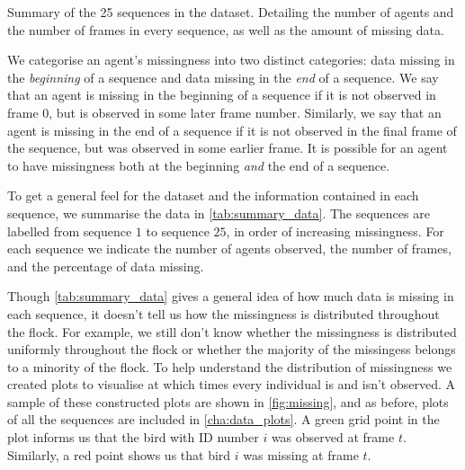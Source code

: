 \begin{table}[!tbp]
	
		\caption{Summary of the 25 sequences in the dataset. Detailing the number of agents and the number
of frames in every sequence, as well as the amount of missing data.}
	\label{tab:summary_data}
\end{table}

We categorise an agent's missingness into two distinct categories: data missing in the \emph{beginning} of a sequence and data missing in the \emph{end} of a sequence. We say that an agent is missing in the beginning of a sequence if it is not observed in frame $0$, but is observed in some later frame number. Similarly, we say that an agent is missing in the end of a sequence if it is not observed in the final frame of the sequence, but was observed in some earlier frame. It is possible for an agent to have missingness both at the beginning \emph{and} the end of a sequence.

To get a general feel for the dataset and the information contained in each sequence, we summarise the data in \cref{tab:summary_data}. The sequences are labelled from sequence $1$ to sequence $25$, in order of increasing missingness. For each sequence we indicate the number of agents observed, the number of frames, and the percentage of data missing.

Though \cref{tab:summary_data} gives a general idea of how much data is missing in each sequence, it doesn't tell us how the missingness is distributed throughout the flock. For example, we still don't know whether the missingness is distributed uniformly throughout the flock or whether the majority of the missingess belongs to a minority of the flock. To help understand the distribution of missingness we created plots to visualise at which times every individual is and isn't observed. A sample of these constructed plots are shown in \cref{fig:missing}, and as before, plots of all the sequences are included in \cref{cha:data_plots}. A green grid point in the plot informs us that the bird with ID number $i$ was observed at frame $t$. Similarly, a red point shows us that bird $i$ was missing at frame $t$.

